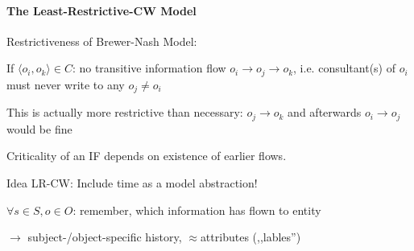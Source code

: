 \documentclass[a4paper]{article}
\begin{document}
\begin{multicols}{3}
    \paragraph{The Least-Restrictive-CW Model}

    Restrictiveness of Brewer-Nash Model:
    \begin{itemize*}
        \item If $\langle o_i,o_k\rangle \in C$: no transitive information flow $o_i \rightarrow o_j\rightarrow o_k$, i.e. consultant(s) of $o_i$ must never write to any $o_j\not=o_i$
        \item This is actually more restrictive than necessary: $o_j\rightarrow o_k$ and afterwards $o_i\rightarrow o_j$ would be fine
        \item Criticality of an IF depends on existence of earlier flows.
    \end{itemize*}

    Idea LR-CW: Include time as a model abstraction!
    \begin{itemize*}
        \item $\forall s\in S,o\in O$: remember, which information has flown to entity
        \item[$\rightarrow$] subject-/object-specific history, $\approx$attributes (,,lables'')
    \end{itemize*}


\end{multicols}
\end{document}
